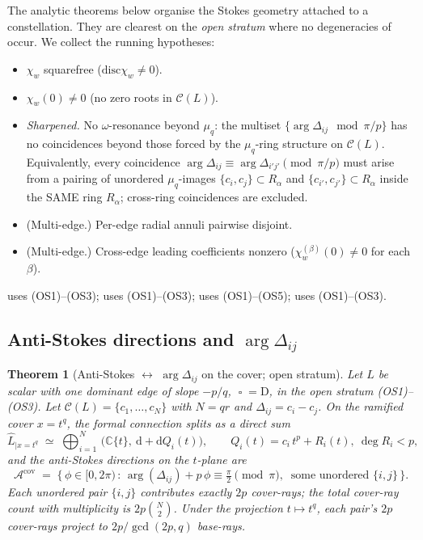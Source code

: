 \documentclass[aip,jmp,preprint,amsmath,amssymb,nofootinbib,floatfix]{revtex4-2}
\theoremstyle{plain}
\newtheorem{theorem}{Theorem}[section]
\theoremstyle{definition}
\theoremstyle{remark}
\newcommand{\op}{\mathop{\square}}                %
\newcommand{\opD}{\mathrm{D}}                     %
\newcommand{\Cl}{\mathcal{C}}
\newcommand{\disc}{\mathrm{disc}}
\newcommand{\Acov}{\mathcal{A}^{\mathrm{cov}}}
\newcommand{\Dij}{\Delta_{ij}}
\DeclareMathOperator{\arginline}{arg}
\begin{document}
The analytic theorems below organise the Stokes geometry attached to a
constellation. They are clearest on the \emph{open stratum} where no
degeneracies of  occur. We collect the running
hypotheses:
\begin{itemize}[leftmargin=2.5em]
\item[(OS1)] $\chi_w$ squarefree ($\disc \chi_w \ne 0$).
\item[(OS2)] $\chi_w(0) \ne 0$ (no zero roots in $\Cl(L)$).
\item[(OS3)] \emph{Sharpened.} No $\omega$-resonance beyond
       $\mu_q$: the multiset $\{\arginline \Dij \mod \pi/p\}$ has no
       coincidences beyond those forced by the $\mu_q$-ring structure
       on $\Cl(L)$. Equivalently, every coincidence
       $\arginline \Dij \equiv \arginline \Delta_{i'j'} \pmod{\pi/p}$
       must arise from a pairing of unordered $\mu_q$-images
       $\{c_i, c_j\} \subset R_\alpha$ and
       $\{c_{i'}, c_{j'}\} \subset R_\alpha$ inside the SAME ring
       $R_\alpha$; cross-ring coincidences are excluded.
\item[(OS4)] (Multi-edge.) Per-edge radial annuli pairwise disjoint.
\item[(OS5)] (Multi-edge.) Cross-edge leading coefficients nonzero
       ($\chi_w^{(\beta)}(0) \ne 0$ for each $\beta$).
\end{itemize}
 uses (OS1)--(OS3);  uses (OS1)--(OS3);
 uses (OS1)--(OS5);  uses (OS1)--(OS3).

\subsection{\texorpdfstring{Anti-Stokes directions and $\arg \Delta_{ij}$}{Anti-Stokes directions and arg Delta\_ij}}\label{ssec:AT1}

\begin{theorem}[Anti-Stokes $\leftrightarrow$ $\arginline \Dij$ on the
cover; open stratum]\label{thm:AT1}
Let $L$ be scalar with one dominant edge of slope $-p/q$, $\op = \opD$, in
the open stratum (OS1)--(OS3). Let $\Cl(L) = \{c_1, \dots, c_N\}$ with
$N = qr$ and $\Dij = c_i - c_j$. On the ramified cover $x = t^q$, the
formal connection splits as a direct sum
\[
   \widehat{L}_{|x = t^q}
   \;\simeq\;
   \bigoplus_{i = 1}^{N}\,
   \big(\mathbb{C}\{t\},\ \mathrm{d} + \mathrm{d} Q_i(t)\big),
   \qquad Q_i(t) = c_i\, t^p + R_i(t),\ \deg R_i < p,
\]
and the anti-Stokes directions on the $t$-plane are
\[
   \Acov
   \;=\;
   \big\{\, \phi \in [0, 2\pi)\, :\,
   \arginline(\Dij) + p\, \phi \equiv \tfrac{\pi}{2} \pmod{\pi},\
   \text{ some unordered } \{i, j\} \,\big\}.
\]
Each unordered pair $\{i, j\}$ contributes exactly $2p$ cover-rays; the
total cover-ray count with multiplicity is $2 p \binom{N}{2}$. Under the
projection $t \mapsto t^q$, each pair's $2p$ cover-rays project to
$2p / \gcd(2p, q)$ base-rays.
\end{theorem}
\end{document}
